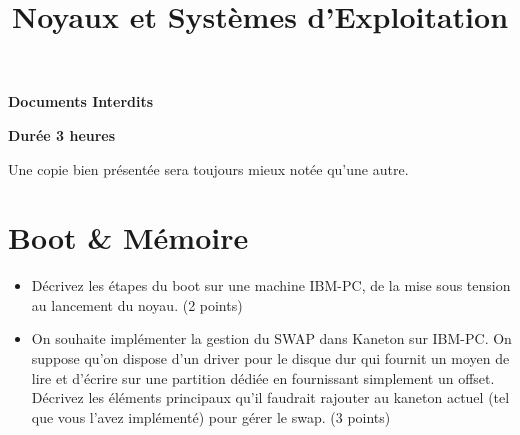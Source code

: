 %
%
%
%
%
%

%
%

%
%

\def\path{../../..}

%
%



%
%

\title{Noyaux et Syst\`emes d'Exploitation}

%
%

\rhead{}

%
%



%
%

\maketitle

%
%

\indentation{}

%
%

\begin{center}

\textbf{Documents Interdits}

\textbf{Dur\'ee 3 heures}

\scriptsize{Une copie bien pr\'esent\'ee sera toujours mieux not\'ee
            qu'une autre.}

\end{center}

%
%

%
%

\section{Boot \& M\'emoire
         {\hfill{} }}

\begin{itemize}
    \item
        D\'ecrivez les \'etapes du boot sur une machine IBM-PC, de la mise sous tension au lancement du noyau. (2 points)
    \item
        On souhaite impl\'ementer la gestion du SWAP dans Kaneton sur IBM-PC. On suppose qu'on dispose d'un driver pour le disque dur qui fournit un moyen de lire et d'\'ecrire sur une partition d\'edi\'ee en fournissant simplement un offset. D\'ecrivez les \'el\'ements principaux qu'il faudrait rajouter au kaneton actuel (tel que vous l'avez impl\'ement\'e) pour g\'erer le swap. (3 points)
\end{itemize}


